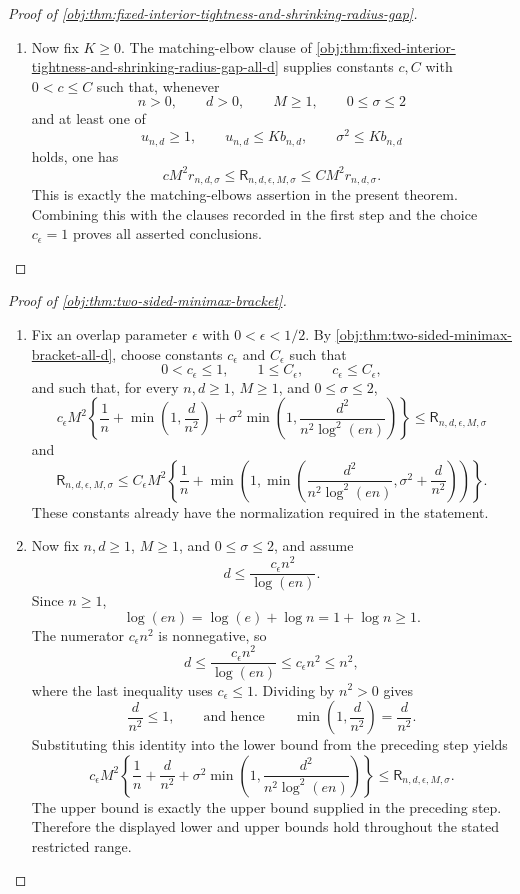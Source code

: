 \begin{proof}[Proof of \cref{obj:thm:fixed-interior-tightness-and-shrinking-radius-gap}]
\begin{enumerate}
\item Now fix \(K\ge0\).  The matching-elbow clause of \cref{obj:thm:fixed-interior-tightness-and-shrinking-radius-gap-all-d} supplies constants \(c,C\) with \(0<c\le C\) such that, whenever
\[
n>0,\qquad d>0,\qquad M\ge1,\qquad 0\le\sigma\le2
\]
and at least one of
\[
u_{n,d}\ge1,\qquad
u_{n,d}\le Kb_{n,d},\qquad
\sigma^2\le Kb_{n,d}
\]
holds, one has
\[
cM^2r_{n,d,\sigma}
\le
\mathsf R_{n,d,\epsilon,M,\sigma}
\le
CM^2r_{n,d,\sigma}.
\]
This is exactly the matching-elbows assertion in the present theorem.  Combining this with the clauses recorded in the first step and the choice \(c_\epsilon=1\) proves all asserted conclusions.  %
\end{enumerate}
\end{proof}

\begin{proof}[Proof of \cref{obj:thm:two-sided-minimax-bracket}]
\begin{enumerate}
\item Fix an overlap parameter \(\epsilon\) with \(0<\epsilon<1/2\).  By \cref{obj:thm:two-sided-minimax-bracket-all-d}, choose constants \(c_{\epsilon}\) and \(C_{\epsilon}\) such that
\[
0<c_{\epsilon}\le 1,\qquad 1\le C_{\epsilon},\qquad c_{\epsilon}\le C_{\epsilon},
\]
and such that, for every \(n,d\ge1\), \(M\ge1\), and \(0\le\sigma\le2\),
\[
c_{\epsilon}M^2
\left\{
\frac1n+\min\left(1,\frac{d}{n^2}\right)
+\sigma^2\min\left(1,\frac{d^2}{n^2\log^2(en)}\right)
\right\}
\le
\mathsf R_{n,d,\epsilon,M,\sigma}
\]
and
\[
\mathsf R_{n,d,\epsilon,M,\sigma}
\le
C_{\epsilon}M^2
\left\{
\frac1n+
\min\left(1,\min\left(\frac{d^2}{n^2\log^2(en)},\sigma^2+\frac{d}{n^2}\right)\right)
\right\}.
\]
These constants already have the normalization required in the statement. %

\item Now fix \(n,d\ge1\), \(M\ge1\), and \(0\le\sigma\le2\), and assume
\[
d\le \frac{c_{\epsilon}n^2}{\log(en)} .
\]
Since \(n\ge1\),
\[
\log(en)=\log(e)+\log n=1+\log n\ge1.
\]
The numerator \(c_{\epsilon}n^2\) is nonnegative, so
\[
d\le \frac{c_{\epsilon}n^2}{\log(en)}
\le c_{\epsilon}n^2
\le n^2,
\]
where the last inequality uses \(c_{\epsilon}\le1\).  Dividing by \(n^2>0\) gives
\[
\frac{d}{n^2}\le1,
\qquad\text{and hence}\qquad
\min\left(1,\frac{d}{n^2}\right)=\frac{d}{n^2}.
\]
Substituting this identity into the lower bound from the preceding step yields
\[
c_{\epsilon}M^2\left\{
\frac{1}{n}+\frac{d}{n^2}
+\sigma^2\min\left(1,\frac{d^2}{n^2\log^2(en)}\right)
\right\}
\le
\mathsf R_{n,d,\epsilon,M,\sigma}.
\]
The upper bound is exactly the upper bound supplied in the preceding step.  Therefore the displayed lower and upper bounds hold throughout the stated restricted range. %
\end{enumerate}
\end{proof}

